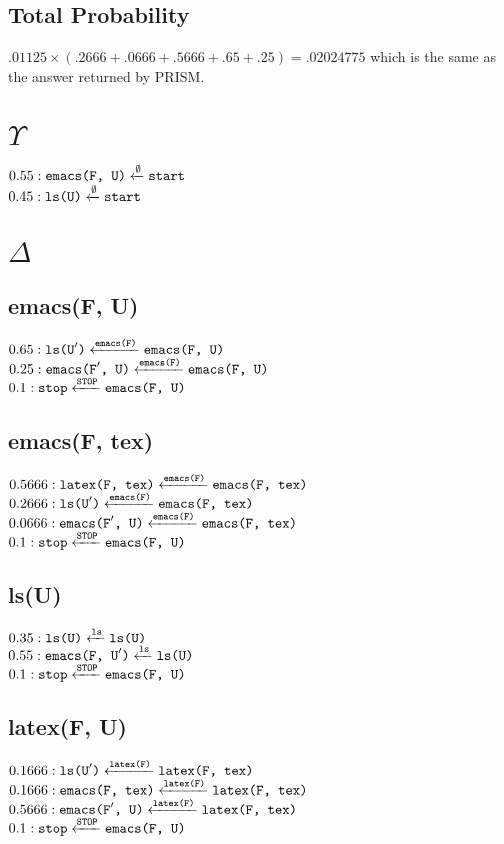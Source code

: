 \documentclass[11pt, oneside]{article}   	%
\begin{document}
\subsection{Total Probability}
$.01125 \times (.2666 + .0666 + .5666 + .65 + .25) = .02024775$ which is the same as the answer returned by PRISM.

\section{$\Upsilon$}
$0.55: \verb!emacs(F, U)! \xleftarrow{\emptyset} \verb!start!$\\
$0.45: \verb!ls(U)! \xleftarrow{\emptyset} \verb!start!$

\section{$\Delta$}
\subsection{emacs(F, U)}
$0.65: \verb!ls(U!'\verb!)! \xleftarrow{\texttt{emacs(F)}} \verb!emacs(F, U)!$\\
$0.25: \verb!emacs(F!'\verb!, U)! \xleftarrow{\texttt{emacs(F)}} \verb!emacs(F, U)!$\\
$0.1: \verb!stop! \xleftarrow{\texttt{STOP}} \verb!emacs(F, U)!$

\subsection{emacs(F, tex)}
$0.5666: \verb!latex(F, tex)! \xleftarrow{\texttt{emacs(F)}} \verb!emacs(F, tex)!$\\
$0.2666: \verb!ls(U!'\verb!)! \xleftarrow{\texttt{emacs(F)}} \verb!emacs(F, tex)!$\\
$0.0666: \verb!emacs(F!'\verb!, U)! \xleftarrow{\texttt{emacs(F)}} \verb!emacs(F, tex)!$\\
$0.1: \verb!stop! \xleftarrow{\texttt{STOP}} \verb!emacs(F, U)!$

\subsection{ls(U)}
$0.35: \verb!ls(U)! \xleftarrow{\texttt{ls}} \verb!ls(U)!$\\
$0.55: \verb!emacs(F, U!'\verb!)! \xleftarrow{\texttt{ls}} \verb!ls(U)!$\\
$0.1: \verb!stop! \xleftarrow{\texttt{STOP}} \verb!emacs(F, U)!$

\subsection{latex(F, U)}
$0.1666: \verb!ls(U!'\verb!)! \xleftarrow{\texttt{latex(F)}} \verb!latex(F, tex)!$\\
$0.1666: \verb!emacs(F, tex)! \xleftarrow{\texttt{latex(F)}} \verb!latex(F, tex)!$\\
$0.5666: \verb!emacs(F!'\verb!, U)! \xleftarrow{\texttt{latex(F)}} \verb!latex(F, tex)!$\\
$0.1: \verb!stop! \xleftarrow{\texttt{STOP}} \verb!emacs(F, U)!$
\end{document}
